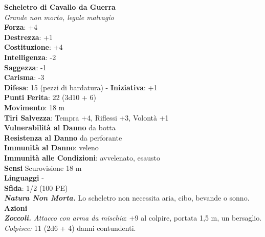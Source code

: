 \begin{multicols}{2}
\medskip\textbf{Scheletro di Cavallo da Guerra}\\
\emph{Grande non morto, legale malvagio}\\
\textbf{Forza}: +4\\
\textbf{Destrezza}: +1\\
\textbf{Costituzione}: +4\\
\textbf{Intelligenza}: -2\\
\textbf{Saggezza}: -1\\
\textbf{Carisma}: -3\\
\textbf{Difesa}: 15 (pezzi di bardatura) - \textbf{Iniziativa}: +1\\
\textbf{Punti Ferita}: 22 (3d10 + 6)\\
\textbf{Movimento}: 18 m\\
\textbf{Tiri Salvezza}: Tempra +4, Riflessi +3, Volontà +1\\
\textbf{Vulnerabilità al Danno} da botta\\
\textbf{Resistenza al Danno} da perforante\\
\textbf{Immunità al Danno}: veleno\\
\textbf{Immunità alle Condizioni}: avvelenato, esausto\\
\textbf{Sensi} Scurovisione 18 m\\
\textbf{Linguaggi} -\\
\textbf{Sfida}: 1/2 (100 PE)\smallskip\\
\emph{\textbf{Natura Non Morta.}} Lo scheletro non necessita aria, cibo, bevande o sonno.\\
\smallskip\textbf{Azioni}\\
\emph{\textbf{Zoccoli.} Attacco con arma da mischia}: +9 al colpire, portata 1,5 m, un bersaglio.\\
\emph{Colpisce:} 11 (2d6 + 4) danni contundenti.\\


\end{multicols}
